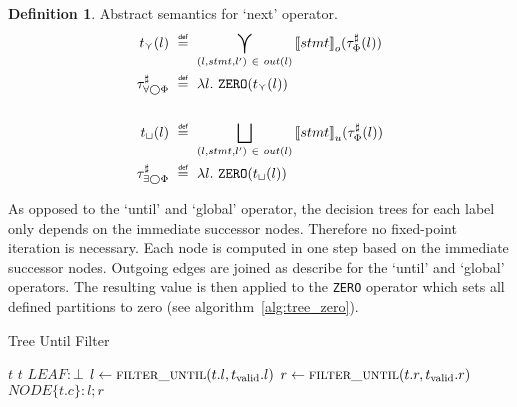 \documentclass[11pt,a4paper,titlepage]{article}
\theoremstyle{definition}
\newtheorem{definition}{Definition}[section]
\newcommand\eqdef{\mathrel{\overset{\makebox[0pt]{\mbox{\normalfont\tiny\sffamily def}}}{=}}}
\begin{document}
\begin{definition}\label{def:abstract_next_semantics}
    Abstract semantics for `next' operator.
    \setlength{\jot}{15pt}
    \begin{align*}
        t_{\curlyvee}(l) \ &\eqdef \  
        \bigcurlyvee\limits_{(l, stmt, l') \ \in \ out(l) } {\llbracket stmt \rrbracket}_{o}(\tau^\sharp_\Phi(l)) \\
        \tau^\sharp_{\forall\bigcirc\Phi} \ &\eqdef \ \lambda l. \ \mathtt{ZERO}(t_{\curlyvee}(l))\\\\
        t_{\sqcup}(l) \ &\eqdef \  
        \bigsqcup\limits_{(l, stmt, l') \ \in \ out(l) } {\llbracket stmt \rrbracket}_{u}(\tau^\sharp_\Phi(l)) \\
        \tau^\sharp_{\exists\bigcirc\Phi} \ &\eqdef \ \lambda l. \ \mathtt{ZERO}(t_{\sqcup}(l))\\
    \end{align*}
\end{definition}

As opposed to the `until' and `global' operator, the decision trees for each label only depends on the immediate successor nodes.
Therefore no fixed-point iteration is necessary. Each node is computed in one step based on the immediate successor nodes.
Outgoing edges are joined as describe for the `until' and `global' operators. The resulting value is then applied to the \texttt{ZERO}
operator which sets all defined partitions to zero (see algorithm~\ref{alg:tree_zero}).




\begin{algorithm}                      
    \caption{Tree Until Filter}         
    \label{alg:tree_until_filter}       
    \begin{algorithmic}
                \LineComment{ignore $NIL$ nodes}
                \State \Return $t$
                \State \Return $t$
                \State \Return $LEAF: \bot$
            \Else
                \State $l \gets \Call{filter\_until}{t.l, t_{\text{valid}}.l}$
                \State $r \gets \Call{filter\_until}{t.r, t_{\text{valid}}.r}$
                \State \Return $NODE\{t.c \}: l ; r$
            \EndIf 
        \EndFunction
\end{algorithmic}
\end{algorithm}
\end{document}
